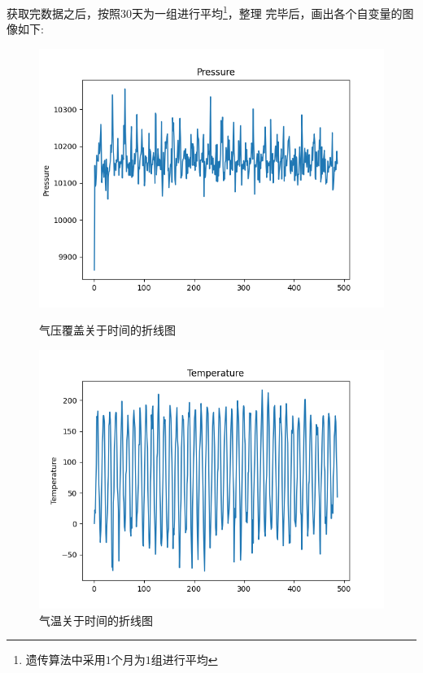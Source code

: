 \documentclass[UTF8, a4paper]{ctexart}
\begin{document}
获取完数据之后，按照$30$天为一组进行平均\footnote{遗传算法中采用$1$个月为$1$组进行平均}，整理
完毕后，画出各个自变量的图像如下:
\begin{figure}[h!]
	\centering
	\begin{minipage}[h!]{0.4\textwidth}
		\centering
		\includegraphics[scale=0.3]{pp.png}
		\caption{气压覆盖关于时间的折线图}
	\end{minipage}
	\qquad
	\begin{minipage}[h!]{0.4\textwidth}
		\centering
		\includegraphics[scale=0.3]{tg.png}
		\caption{气温关于时间的折线图}
	\end{minipage}
\end{figure}
\end{document}

